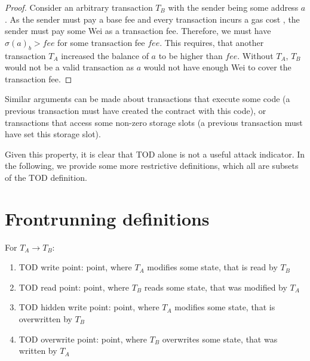 \documentclass[draft,final]{vutinfth} %
\begin{document}
\begin{proof}
    Consider an arbitrary transaction $T_B$ with the sender being some address $a$. As the sender must pay a base fee \cite[p.8]{wood_ethereum_2024} and every transaction incurs a gas cost \cite[p.9]{wood_ethereum_2024}, the sender must pay some Wei as a transaction fee. Therefore, we must have $\sigma(a)_b > fee$ for some transaction fee $fee$. This requires, that another transaction $T_A$ increased the balance of $a$ to be higher than $fee$. Without $T_A$, $T_B$ would not be a valid transaction as $a$ would not have enough Wei to cover the transaction fee.
\end{proof}

Similar arguments can be made about transactions that execute some code (a previous transaction must have created the contract with this code), or transactions that access some non-zero storage slots (a previous transaction must have set this storage slot).

Given this property, it is clear that TOD alone is not a useful attack indicator. In the following, we provide some more restrictive definitions, which all are subsets of the TOD definition.

\chapter{Frontrunning definitions}



For $T_A \rightarrow T_B$:


\begin{enumerate}
    \item TOD write point: point, where $T_A$ modifies some state, that is read by $T_B$
    \item TOD read point: point, where $T_B$ reads some state, that was modified by $T_A$
    \item TOD hidden write point: point, where $T_A$ modifies some state, that is overwritten by $T_B$
    \item TOD overwrite point: point, where $T_B$ overwrites some state, that was written by $T_A$
\end{enumerate}
\end{document}
